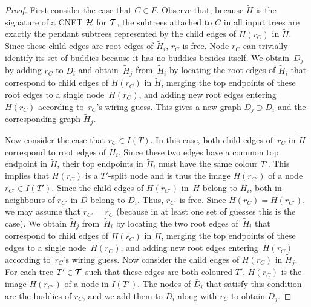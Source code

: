 \begin{proof}
  First consider the case that {$C \in F$}. Observe that, because $\tilde H$ is the signature of a CNET $\mathcal{H}$ for $\mathcal{T}$, the {subtrees attached to} $C$ in all input trees are exactly the {pendant} subtrees represented by the child
edges of $H(r_C)$ in $\tilde H$. Since these child edges are root edges of $\tilde H_i$, $r_C$ is free. Node $r_C$ can trivially identify its set of buddies because it has no buddies besides itself. We obtain~$D_j$ by adding $r_C$ to $D_i$ and obtain~$\tilde H_j$ from~$\tilde H_i$ by locating the root edges of $\tilde H_i$ that correspond to child edges of $H(r_C)$ in $\tilde H$, merging the top endpoints of these root edges to a single node~$H(r_C)$, and adding new root edges entering~$H(r_C)$ according to~$r_C$'s wiring guess.
  This gives a new graph $D_j \supset D_i$ and the corresponding graph
  $\tilde H_j$.

  Now consider the case that $r_C \in I(T)$. In this case, both child edges of~$r_C$ in $\tilde H$ correspond to root edges of $\tilde H_i$.
  Since these two edges have a common top endpoint in $\tilde H$, their
  top endpoints in $\tilde H_i$ must have the same colour $T'$.
  This implies that $H(r_C)$ is a $T'$-split node and is thus the image
  $H(r_{C'})$ of a node $r_{C'} \in I(T')$.
  Since the child edges of $H(r_{C'})$ in~$\tilde H$ belong to $\tilde H_i$, both
  in-neighbours of $r_{C'}$ in $D$ belong to $D_i$.
  Thus, $r_{C'}$ is free.
  Since $H(r_C) = H(r_{C'})$, we may assume that $r_{C'} = r_C$ (because in at least one set of guesses this is the case). We obtain $\tilde H_j$ from~$\tilde H_i$ by locating the two root edges of~$\tilde H_i$ that correspond to child edges of $H(r_C)$ in $\tilde H$, merging the top endpoints of these edges to a single node~$H(r_C)$, and adding new root edges entering~$H(r_C)$ according to~$r_C$'s wiring guess.
  Now consider the child edges of $H(r_C)$ in $\tilde H_j$.
  For each tree $T' \in \mathcal{T}$ such that these edges are both coloured $T'$,
  $H(r_C)$ is the image $H(r_{C'})$ of a node in $I(T')$.
  The nodes of $\bar D_i$ that satisfy this condition are the buddies of
  $r_C$, and we add them to $D_i$ along with $r_C$ to obtain $D_j$.


\end{proof}
